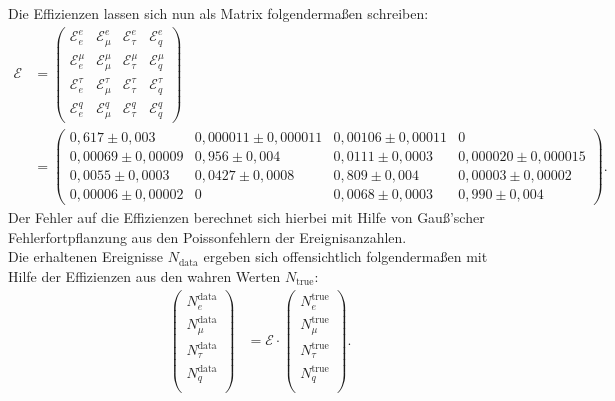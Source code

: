 Die Effizienzen lassen sich nun als Matrix folgendermaßen schreiben:
\begin{align}
	\mathcal{E}&=
	\begin{pmatrix}
		\mathcal{E}_{e}^{e}&
		\mathcal{E}_{\mu}^{e}&
		\mathcal{E}_{\tau}^{e}&
		\mathcal{E}_{q}^{e}\\
		\mathcal{E}_{e}^{\mu}&
		\mathcal{E}_{\mu}^{\mu}&
		\mathcal{E}_{\tau}^{\mu}&
		\mathcal{E}_{q}^{\mu}\\
		\mathcal{E}_{e}^{\tau}&
		\mathcal{E}_{\mu}^{\tau}&
		\mathcal{E}_{\tau}^{\tau}&
		\mathcal{E}_{q}^{\tau}\\
		\mathcal{E}_{e}^{q}&
		\mathcal{E}_{\mu}^{q}&
		\mathcal{E}_{\tau}^{q}&
		\mathcal{E}_{q}^{q}
	\end{pmatrix}
	\\&=
	\begin{pmatrix}
		0,617\pm0,003&0,000011\pm0,000011&0,00106\pm0,00011&0\\
		0,00069\pm0,00009&0,956\pm0,004&0,0111\pm0,0003&0,000020\pm0,000015\\
		0,0055\pm0,0003&0,0427\pm0,0008&0,809\pm0,004&0,00003\pm0,00002\\
		0,00006\pm0,00002&0&0,0068\pm0,0003&0,990\pm0,004
	\end{pmatrix}\text{.}
\end{align}
Der Fehler auf die Effizienzen berechnet sich hierbei mit Hilfe von Gauß'scher Fehlerfortpflanzung aus den Poissonfehlern der Ereignisanzahlen.\\

Die erhaltenen Ereignisse $N_\text{data}$ ergeben sich offensichtlich folgendermaßen mit Hilfe der Effizienzen aus den wahren Werten $N_\text{true}$:
\begin{align}
	\begin{pmatrix}
		N_e^\text{data}\\
		N_\mu^\text{data}\\
		N_\tau^\text{data}\\
		N_q^\text{data}\\
	\end{pmatrix}
	&=
	\mathcal{E}\cdot
	\begin{pmatrix}
	N_e^\text{true}\\
	N_\mu^\text{true}\\
	N_\tau^\text{true}\\
	N_q^\text{true}\\
	\end{pmatrix}\text{.}
\end{align}

